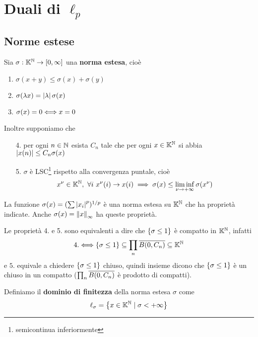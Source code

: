 \chapter{Duali di \texorpdfstring{$\ell_p$}{lp}}
\section{Norme estese}
\begin{definition}
Sia $\sigma:\mathbb{K}^{\mathbb{N}}\to [0,\infty]$ una \textbf{norma estesa}, cio\`e
\begin{enumerate}
    \item $\sigma(x+y)\leq \sigma(x)+\sigma(y)$
    \item $\sigma(\lambda x)=\left|{\lambda}\right|\sigma(x)$
    \item $\sigma(x)=0\Longleftrightarrow x=0$
\end{enumerate}
\end{definition}
\noindent
Inoltre supponiamo che 
\begin{enumerate}
    \item[4.] per ogni $n\in\mathbb{N}$ esista $C_n$ tale che per ogni $x\in\mathbb{K}^{\mathbb{N}}$ si abbia $\left|{x(n)}\right|\leq C_n\sigma(x)$
    \item[5.] $\sigma$ \`e LSC\footnote{semicontinua inferiormente} rispetto alla convergenza puntale, cio\`e
    \[x^\nu\in \K^\N,\ \forall i\ x^\nu(i)\to x(i)\implies \sigma(x)\leq \liminf_{\nu\to+\infty}\sigma(x^\nu)\]
\end{enumerate}
\begin{example}
La funzione $\sigma(x)=(\sum\left|{x_i}\right|^p)^{1/p}$ \`e una norma estesa su $\mathbb{K}^{\mathbb{N}}$ che ha propriet\`a indicate. Anche $\sigma(x)=\left\Vert{x}\right\Vert_\infty$ ha queste propriet\`a.
\end{example}

\begin{remark}
Le propriet\`a 4. e 5. sono equivalenti a dire che $\left\{{\sigma\leq 1}\right\}$ \`e compatto in $\mathbb{K}^{\mathbb{N}}$, infatti
\[4.\Longleftrightarrow \left\{{\sigma\leq 1}\right\}\subseteq \prod_n\overline{B(0,C_n)}\subseteq \mathbb{K}^{\mathbb{N}}\]
e $5.$ equivale a chiedere $\left\{{\sigma\leq 1}\right\}$ chiuso, quindi insieme dicono che $\left\{{\sigma\leq 1}\right\}$ \`e un chiuso in un compatto ($\prod_n\overline{B(0,C_n)}$ \`e prodotto di compatti).
\end{remark}

\begin{definition}
Definiamo il \textbf{dominio di finitezza} della norma estesa $\sigma$ come
\[\ell_\sigma=\left\{{x\in\mathbb{K}^{\mathbb{N}}\mid \sigma<+\infty}\right\}\]
\end{definition}

